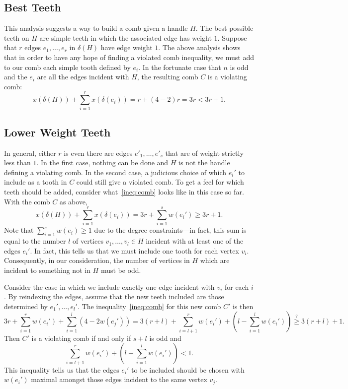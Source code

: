 \documentclass[11pt, letterpaper]{amsart}
\theoremstyle{plain}
\theoremstyle{definition}
\theoremstyle{remark}
\begin{document}
\subsection{Best Teeth}
This analysis suggests a way to build a comb given a handle $H$. The best
possible teeth on $H$ are simple teeth in which the associated edge has weight
$1$. Suppose that $r$ edges $e_1,\ldots,e_r$ in $\delta(H)$ have edge weight
$1$.  The above analysis shows that in order to have any hope of finding a
violated comb inequality, we must add to our comb each simple tooth defined by
$e_i$. In the fortunate case that $n$ is odd and the $e_i$ are all the edges
incident with $H$, the resulting comb $C$ is a violating comb:
\begin{equation*}
  x(\delta(H)) + \sum^r_{i = 1}x(\delta(e_i)) = r + (4 - 2)r = 3r < 3r + 1.
\end{equation*}

\subsection{Lower Weight Teeth}
In general, either $r$ is even there are edges $e'_1,\ldots,e'_s$ that are of
weight strictly less than $1$. In the first case, nothing can be done and $H$
is not the handle defining a violating comb. In the second case, a judicious
choice of which $e_i'$ to include as a tooth in $C$ could still give a violated
comb. To get a feel for which teeth should be added, consider what~\eqref{ineq:comb} looks
like in this case so far. With the comb $C$ as above,
\begin{equation*}
  x(\delta(H)) + \sum^r_{i = 1}x(\delta(e_i)) = 3r + \sum^s_{i = 1}w(e_i') \geq 3r + 1.
\end{equation*}
Note that $\sum^s_{i = 1}w(e_i) \geq 1$ due to the degree constraints---in
fact, this sum is equal to the number $l$ of vertices $v_1,\ldots,v_l \in H$
incident with at least one of the edges $e_i'$. In fact, this tells us that we
must include one tooth for each vertex $v_i$. Consequently, in our
consideration, the number of vertices in $H$ which are incident to something
not in $H$ must be odd.

Consider the case in which we include exactly one edge incident with $v_i$ for
each $i$. By reindexing the edges, assume that the new teeth included are those
determined by $e_1',\ldots,e_l'$. The inequality~\eqref{ineq:comb} for this new comb $C'$
is then
\begin{equation*}
  3r + \sum^r_{i = 1} w(e_i') + \sum^l_{i = 1}(4 - 2w(e_j')) = 3(r+l) + \sum^r_{i = l+1}w(e_i') + \left(l - \sum^l_{i = 1}w(e_i')\right) \stackrel{?}{\geq} 3(r+l) + 1.
\end{equation*}
Then $C'$ is a violating comb if and only if $s + l$ is odd and
\begin{equation}\label{ineq:2}
  \sum^r_{i = l+1} w(e_i') + \left(l - \sum^l_{i = 1}w(e_i')\right) < 1.
\end{equation}
This inequality tells us that the edges $e_i'$ to be included should be chosen
with $w(e_i')$ maximal amongst those edges incident to the same vertex $v_j$.
\end{document}
